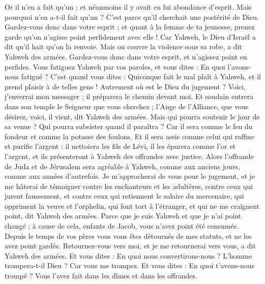 \begin{multicols}{2}
Or il n'en a fait qu'un ; et néanmoins il y avait en lui abondance d'esprit. Mais pourquoi n'en a-t-il fait qu'un ? C'est parce qu'il cherchait une postérité de Dieu. Gardez-vous donc dans votre esprit ; et quant à la femme de ta jeunesse, prenez garde qu'on n'agisse point perfidement avec elle !
Car Yahweh, le Dieu d'Israël a dit qu'il hait qu'on la renvoie. Mais on couvre la violence sous sa robe, a dit Yahweh des armées. Gardez-vous donc dans votre esprit, et n'agissez point en perfides.
Vous fatiguez Yahweh par vos paroles, et vous dites : En quoi l'avons-nous fatigué ? C'est quand vous dites : Quiconque fait le mal plaît à Yahweh, et il prend plaisir à de telles gens ! Autrement où est le Dieu du jugement ?
\VerseOne{}Voici, j'enverrai mon messager ; il préparera le chemin devant moi. Et soudain entrera dans son temple le Seigneur que vous cherchez ; l'Ange de l'Alliance, que vous désirez, voici, il vient, dit Yahweh des armées.
Mais qui pourra soutenir le jour de sa venue ? Qui pourra subsister quand il paraîtra ? Car il sera comme le feu du fondeur et comme la potasse des foulons.
Et il sera assis comme celui qui raffine et purifie l'argent ; il nettoiera les fils de Lévi, il les épurera comme l'or et l'argent, et ils présenteront à Yahweh des offrandes avec justice.
Alors l'offrande de Juda et de Jérusalem sera agréable à Yahweh, comme aux anciens jours, comme aux années d'autrefois.
Je m'approcherai de vous pour le jugement, et je me hâterai de témoigner contre les enchanteurs et les adultères, contre ceux qui jurent faussement, et contre ceux qui retiennent le salaire du mercenaire, qui oppriment la veuve et l'orphelin, qui font tort à l'étranger, et qui ne me craignent point, dit Yahweh des armées.
Parce que je suis Yahweh et que je n'ai point changé ; à cause de cela, enfants de Jacob, vous n'avez point été consumés.
Depuis le temps de vos pères vous vous êtes détournés de mes statuts, et ne les avez point gardés. Retournez-vous vers moi, et je me retournerai vers vous, a dit Yahweh des armées. Et vous dites : En quoi nous convertirons-nous ?
L'homme trompera-t-il Dieu ? Car vous me trompez. Et vous dites : En quoi t'avons-nous trompé ? Vous l'avez fait dans les dîmes et dans les offrandes.

\end{multicols}
